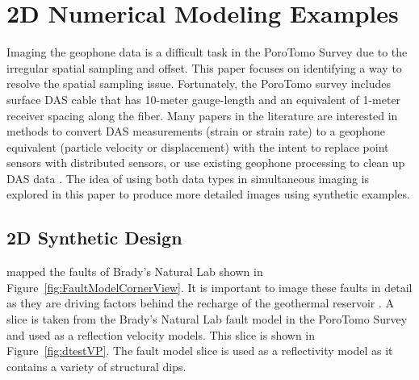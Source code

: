 \section{2D Numerical Modeling Examples}
Imaging the geophone data is a difficult task in the PoroTomo Survey due to the irregular spatial sampling and offset. This paper focuses on identifying a way to resolve the spatial sampling issue. Fortunately, the PoroTomo survey includes surface DAS cable that has 10-meter gauge-length and an equivalent of 1-meter receiver spacing along the fiber. Many papers in the literature are interested in methods to convert DAS measurements (strain or strain rate) to a geophone equivalent (particle velocity or displacement) with the intent to replace point sensors with distributed sensors, or use existing geophone processing to clean up DAS data \citep{daley2013field,daley2015field,jreij2017field}. The idea of using both data types in simultaneous imaging is explored in this paper to produce more detailed images using synthetic examples.

\subsection{2D Synthetic Design}
\citet{siler2013three} mapped the faults of Brady's Natural Lab shown in Figure~\ref{fig:FaultModelCornerView}. It is important to image these faults in detail as they are driving factors behind the recharge of the geothermal reservoir \citep{feigl2017overview,folsomimaging}. A slice is taken from the Brady's Natural Lab fault model \citep{siler2013three} in the PoroTomo Survey and used as a reflection velocity models. This slice is shown in Figure~\ref{fig:dtestVP}. The \citet{siler2013three} fault model slice is used as a reflectivity model as it contains a variety of structural dips.





